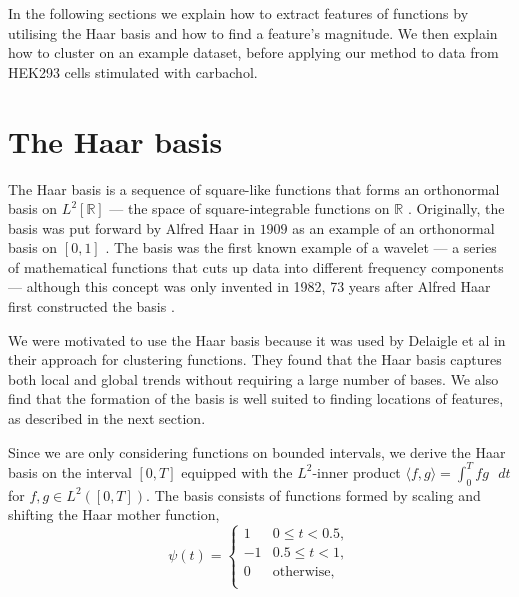 \documentclass[../main.tex]{subfiles}
\begin{document}
 In the following sections we explain how to extract features of functions by utilising the Haar basis and how to find a feature's magnitude. We then explain how to cluster on an example dataset, before applying our method to data from HEK293 cells stimulated with carbachol. 

\section{The Haar basis}
The Haar basis is a sequence of square-like functions that forms an orthonormal basis on $L^2[\mathbb{R}]$ --- the space of square-integrable functions on $\mathbb{R}$ . Originally, the basis was put forward by Alfred Haar in $1909$ as an example of an orthonormal basis on $[0,1]$ \cite{Haar_1910}. The basis was the first known example of a wavelet --- a series of mathematical functions that cuts up data into different frequency components --- although this concept was only invented in 1982, 73 years after Alfred Haar first constructed the basis \cite{Debnath_2003}.  
 
We were motivated to use the Haar basis because it was used by Delaigle et al \cite{Delaigle_2019} in their approach for clustering functions. They found that the Haar basis captures both local and global trends without requiring a large number of bases. We also find that the formation of the basis is well suited to finding locations of features, as described in the next section. 


 Since we are only considering functions on bounded intervals, we derive the Haar basis on the interval $[0,T]$ equipped with the $L^2$-inner product $\langle f,g \rangle = \int^T_0 fg \text{ }  dt$ for $f,g \in L^2\left( \left[0,T \right] \right)$. The basis consists of functions formed by scaling and shifting the Haar mother function, 
\begin{equation*}
\psi(t) =
\begin{cases}
	1 & 0 \leq t < 0.5,\\
	-1 & 0.5 \leq t <1,\\
	0 & \text{otherwise,}\\
\end{cases} 	
\end{equation*}
\end{document}

